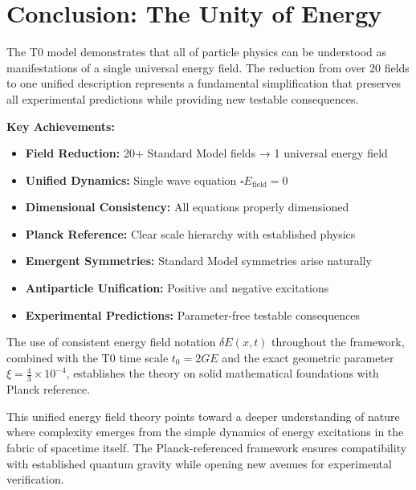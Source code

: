 \documentclass[12pt,a4paper]{report}
\newcommand{\tzero}{t_0}                  %
\begin{document}
	\section{Conclusion: The Unity of Energy}
	\label{sec:conclusion_unity}
	
	The T0 model demonstrates that all of particle physics can be understood as manifestations of a single universal energy field. The reduction from over 20 fields to one unified description represents a fundamental simplification that preserves all experimental predictions while providing new testable consequences.
	
	\textbf{Key Achievements:}
	\begin{itemize}
		\item \textbf{Field Reduction:} 20+ Standard Model fields → 1 universal energy field
		\item \textbf{Unified Dynamics:} Single wave equation $\square E_{\text{field}} = 0$
		\item \textbf{Dimensional Consistency:} All equations properly dimensioned
		\item \textbf{Planck Reference:} Clear scale hierarchy with established physics
		\item \textbf{Emergent Symmetries:} Standard Model symmetries arise naturally
		\item \textbf{Antiparticle Unification:} Positive and negative excitations
		\item \textbf{Experimental Predictions:} Parameter-free testable consequences
	\end{itemize}
	
	The use of consistent energy field notation $\delta E(x,t)$ throughout the framework, combined with the T0 time scale $\tzero = 2GE$ and the exact geometric parameter $\xi = \frac{4}{3} \times 10^{-4}$, establishes the theory on solid mathematical foundations with Planck reference.
	
	This unified energy field theory points toward a deeper understanding of nature where complexity emerges from the simple dynamics of energy excitations in the fabric of spacetime itself. The Planck-referenced framework ensures compatibility with established quantum gravity while opening new avenues for experimental verification.
\end{document}
